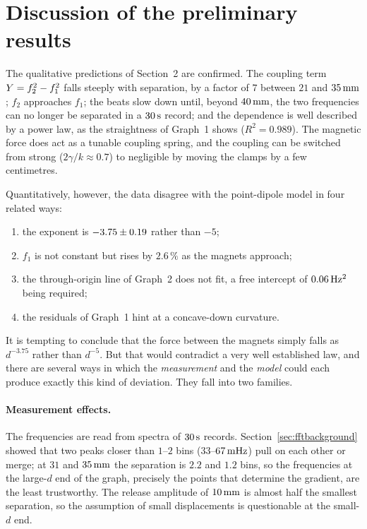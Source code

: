 \section{Discussion of the preliminary results}\label{sec:discussion}

The qualitative predictions of Section~2 are confirmed. The coupling term $Y=f_2^2-f_1^2$ falls steeply with separation, by a factor of $7$ between $21$ and $35\,\mathrm{mm}$; $f_2$ approaches $f_1$; the beats slow down until, beyond $40\,\mathrm{mm}$, the two frequencies can no longer be separated in a $30\,\mathrm{s}$ record; and the dependence is well described by a power law, as the straightness of Graph~1 shows ($R^2=0.989$). The magnetic force does act as a tunable coupling spring, and the coupling can be switched from strong ($2\gamma/k\approx0.7$) to negligible by moving the clamps by a few centimetres.

Quantitatively, however, the data disagree with the point-dipole model in four related ways:
\begin{enumerate}
\item the exponent is $-3.75\pm0.19$ rather than $-5$;
\item $f_1$ is not constant but rises by $2.6\,\%$ as the magnets approach;
\item the through-origin line of Graph~2 does not fit, a free intercept of $0.06\,\mathrm{Hz^2}$ being required;
\item the residuals of Graph~1 hint at a concave-down curvature.
\end{enumerate}

It is tempting to conclude that the force between the magnets simply falls as $d^{-3.75}$ rather than $d^{-5}$. But that would contradict a very well established law, and there are several ways in which the \emph{measurement} and the \emph{model} could each produce exactly this kind of deviation. They fall into two families.

\paragraph{Measurement effects.} The frequencies are read from spectra of $30\,\mathrm{s}$ records. Section~\ref{sec:fftbackground} showed that two peaks closer than $1$--$2$ bins ($33$--$67\,\mathrm{mHz}$) pull on each other or merge; at $31$ and $35\,\mathrm{mm}$ the separation is $2.2$ and $1.2$ bins, so the frequencies at the large-$d$ end of the graph, precisely the points that determine the gradient, are the least trustworthy. The release amplitude of $10\,\mathrm{mm}$ is almost half the smallest separation, so the assumption of small displacements is questionable at the small-$d$ end.

